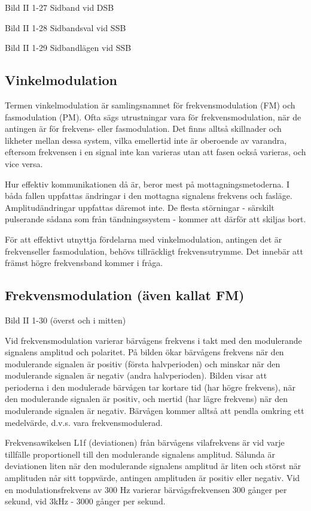 \documentclass[a4paper,twoside,twocolumn,openright]{book}
\begin{document}
Bild II 1-27 Sidband vid DSB

Bild II 1-28 Sidbandsval vid SSB

Bild II 1-29 Sidbandlägen vid SSB

\subsection{Vinkelmodulation}
Termen vinkelmodulation är samlingsnamnet för frekvensmodulation (FM) och fasmodulation
(PM). Ofta sägs utrustningar vara för frekvensmodulation, när de antingen är för frekvens-
eller fasmodulation. Det finns alltså skillnader och likheter mellan dessa system, vilka
emellertid inte är oberoende av varandra, eftersom frekvensen i en signal inte kan
varieras utan att fasen också varieras, och vice versa.

Hur effektiv kommunikationen då är, beror mest på mottagningsmetoderna. I båda fallen
uppfattas ändringar i den mottagna signalens frekvens och fasläge. Amplitudändringar
uppfattas däremot inte. De flesta störningar - särskilt pulserande sådana som från
tändningssystem - kommer att därför att skiljas bort.

För att effektivt utnyttja fördelarna med vinkelmodulation, antingen det är frekvenseller
fasmodulation, behövs tillräckligt frekvensutrymme. Det innebär att främst högre
frekvensband kommer i fråga.

\subsection{Frekvensmodulation (även kallat FM)}

Bild II 1-30 (överst och i mitten)

Vid frekvensmodulation varierar bärvågens frekvens i takt med den modulerande signalens
amplitud och polaritet. På bilden ökar bärvågens frekvens när den modulerande signalen är
positiv (första halvperioden) och minskar när den modulerande signalen är negativ (andra
halvperioden). Bilden visar att perioderna i den modulerade bärvågen tar kortare tid (har
högre frekvens), när den modulerande signalen är positiv, och mertid (har lägre frekvens)
när den modulerande signalen är negativ. Bärvågen kommer alltså att pendla omkring ett
medelvärde, d.v.s. vara frekvensmodulerad.

Frekvensawikelsen L1f (deviationen) från bärvågens vilafrekvens är vid varje tillfälle
proportionell till den modulerande signalens amplitud. Sålunda är deviationen liten när
den modulerande signalens amplitud är liten och störst när amplituden når sitt toppvärde,
antingen amplituden är positiv eller negativ. Vid en modulationsfrekvens av 300 Hz
varierar bärvågsfrekvensen 300 gånger per sekund, vid 3kHz - 3000 gånger per sekund.
\end{document}
